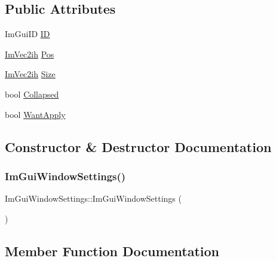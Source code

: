 \subsection*{Public Attributes}
\begin{DoxyCompactItemize}
\item 
Im\+Gui\+ID \hyperlink{structImGuiWindowSettings_a5ae7316219230c82a05618c227e5a7b7}{ID}
\item 
\hyperlink{structImVec2ih}{Im\+Vec2ih} \hyperlink{structImGuiWindowSettings_afe2e8f97751166b10042bfd537e77c89}{Pos}
\item 
\hyperlink{structImVec2ih}{Im\+Vec2ih} \hyperlink{structImGuiWindowSettings_a7e4a26f4e4bfaf97a379641dcdbb6d14}{Size}
\item 
bool \hyperlink{structImGuiWindowSettings_a79308182bdab97cb87b3d6284f22c1d2}{Collapsed}
\item 
bool \hyperlink{structImGuiWindowSettings_a4426a1fdde8c99e0bb2b155a9073de93}{Want\+Apply}
\end{DoxyCompactItemize}


\subsection{Constructor \& Destructor Documentation}
\mbox{\label{structImGuiWindowSettings_a694e496dba59b5aaabe14cce66309acd}} 
\subsubsection{\texorpdfstring{Im\+Gui\+Window\+Settings()}{ImGuiWindowSettings()}}
{\footnotesize\ttfamily Im\+Gui\+Window\+Settings\+::\+Im\+Gui\+Window\+Settings (\begin{DoxyParamCaption}{ }\end{DoxyParamCaption})\hspace{0.3cm}{\ttfamily [inline]}}



\subsection{Member Function Documentation}
\mbox{\label{structImGuiWindowSettings_aeb65945139ec9f3bfaf5b11040419373}} 
